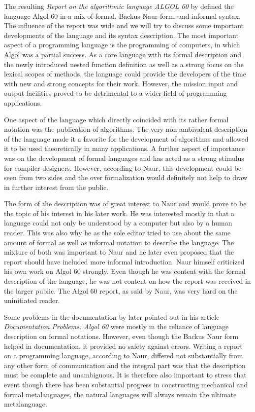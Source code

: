 \documentclass{article}
\begin{document}
The resulting \textit{Report on the algorithmic language ALGOL 60} by \citet{backus1960report} defined the language Algol 60 in a mix of formal, Backus Naur form, and informal syntax. The influence of the report was wide and we will try to discuss some important developments of the language and its syntax description. The most important aspect of a programming language is the programming of computers, in which Algol was a partial success. As a core language with its formal description and the newly introduced nested function definition as well as a strong focus on the lexical scopes of methods, the language could provide the developers of the time with new and strong concepts for their work. However, the mission input and output facilities proved to be detrimental to a wider field of programming applications.

One aspect of the language which directly coincided with its rather formal notation was the publication of algorithms. The very non ambivalent description of the language made it a favorite for the development of algorithms and allowed it to be used theoretically in many applications. A further aspect of importance was on the development of formal languages and has acted as a strong stimulus for compiler designers. However, according to Naur, this development could be seen from two sides and the over formalization would definitely not help to draw in further interest from the public.

The form of the description was of great interest to Naur and would prove to be the topic of his interest in his later work. He was interested mostly in that a language could not only be understood by a computer but also by a human reader. This was also why he as the sole editor tried to use about the same amount of formal as well as informal notation to describe the language. The mixture of both was important to Naur and he later even proposed that the report should have included more informal introduction. Naur himself criticized his own work on Algol 60 strongly. Even though he was content with the formal description of the language, he was not content on how the report was received in the larger public. The Algol 60 report, as said by Naur, was very hard on the uninitiated reader.

Some problems in the documentation by \citet{naur1963documentation} later pointed out in his article \textit{Documentation Problems: Algol 60} were mostly in the reliance of language description on formal notations. However, even though the Backus Naur form helped in documentation, it provided no safety against errors. Writing a report on a programming language, according to Naur, differed not substantially from any other form of communication and the integral part was that the description must be complete and unambiguous. It is therefore also important to stress that event though there has been substantial progress in constructing mechanical and formal metalanguages, the natural languages will always remain the ultimate metalanguage.
\end{document}
